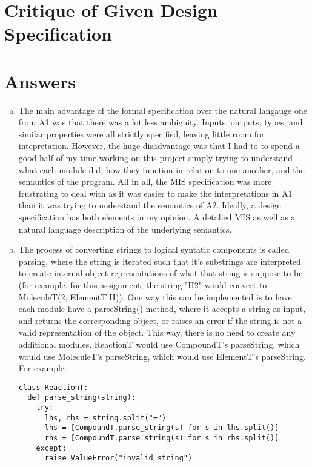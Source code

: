\documentclass[12pt]{article}
\begin{document}
\section{Critique of Given Design Specification}


\section{Answers}
\begin{enumerate}[a)]

\item The main advantage of the formal specification over the natural langauge one from A1 was that there was a lot less ambiguity. Inputs, outputs, types, and similar properties were all strictly specified, leaving little room for intepretation. However, the huge disadvantage was that I had to to spend a good half of my time working on this project simply trying to understand what each module did, how they function in relation to one another, and the semantics of the program. All in all, the MIS specification was more frustrating to deal with as it was easier to make the interpretations in A1 than it was trying to understand the semantics of A2. Ideally, a design specification has both elements in my opinion. A detalied MIS as well as a natural language description of the underlying semantics.

\item The process of converting strings to logical syntatic components is called parsing, where the string is iterated such that it's substrings are interpreted to create internal object representations of what that string is suppose to be (for example, for this assignment, the string "H2" would convert to MoleculeT(2, ElementT.H)). One way this can be implemented is to have each module have a parseString() method, where it accepts a string as input, and returns the corresponding object, or raises an error if the string is not a valid representation of the object. This way, there is no need to create any additional modules. ReactionT would use CompoundT's parseString, which would use MoleculeT's parseString, which would use ElementT's parseString. For example:
\begin{lstlisting}
class ReactionT:
  def parse_string(string):
    try:
      lhs, rhs = string.split("=")
      lhs = [CompoundT.parse_string(s) for s in lhs.split()]
      rhs = [CompoundT.parse_string(s) for s in rhs.split()]
    except:
      raise ValueError("invalid string")


\end{lstlisting}
\end{enumerate}
\end{document}
